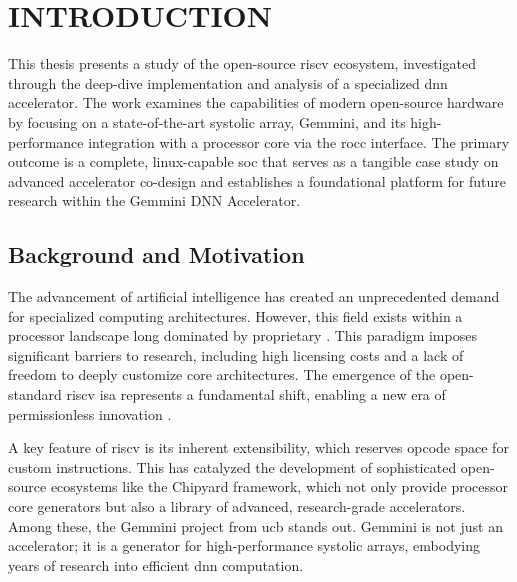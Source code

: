 

\chapter{INTRODUCTION}
\label{Chapter1}

This thesis presents a study of the open-source \acrshort{riscv} ecosystem, investigated through the deep-dive implementation and analysis of a specialized \acrfull{dnn} accelerator. The work examines the capabilities of modern open-source hardware by focusing on a state-of-the-art systolic array, Gemmini, and its high-performance integration with a processor core via the \acrfull{rocc} interface. The primary outcome is a complete, \acrshort{linux}-capable \acrfull{soc} that serves as a tangible case study on advanced accelerator co-design and establishes a foundational platform for future research within the Gemmini DNN Accelerator.

\section{Background and Motivation}

The advancement of artificial intelligence has created an unprecedented demand for specialized computing architectures. However, this field exists within a processor landscape long dominated by proprietary . This paradigm imposes significant barriers to research, including high licensing costs and a lack of freedom to deeply customize core architectures. The emergence of the open-standard \acrshort{riscv} \acrshort{isa} represents a fundamental shift, enabling a new era of permissionless innovation \cite{Asanovic:EECS-2014-146}.

A key feature of \acrshort{riscv} is its inherent extensibility, which reserves opcode space for custom instructions. This has catalyzed the development of sophisticated open-source ecosystems like the Chipyard framework, which not only provide processor core generators but also a library of advanced, research-grade accelerators. Among these, the Gemmini project from \acrshort{ucb} stands out. Gemmini is not just an accelerator; it is a generator for high-performance systolic arrays, embodying years of research into efficient \acrshort{dnn} computation.

